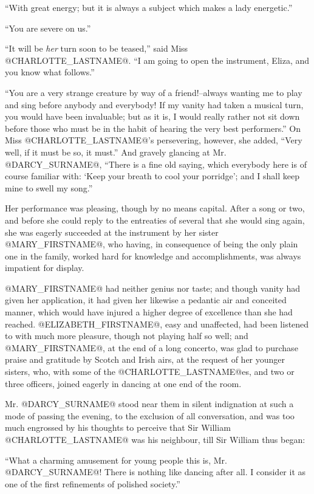 ``With great energy; but it is always a subject which makes a lady
energetic.''

``You are severe on us.''

``It will be \textit{her} turn soon to be teased,'' said Miss @CHARLOTTE_LASTNAME@. ``I am going
to open the instrument, Eliza, and you know what follows.''

``You are a very strange creature by way of a friend!--always wanting me
to play and sing before anybody and everybody! If my vanity had taken
a musical turn, you would have been invaluable; but as it is, I would
really rather not sit down before those who must be in the habit of
hearing the very best performers.'' On Miss @CHARLOTTE_LASTNAME@'s persevering, however,
she added, ``Very well, if it must be so, it must.'' And gravely glancing
at Mr. @DARCY_SURNAME@, ``There is a fine old saying, which everybody here is of
course familiar with: `Keep your breath to cool your porridge'; and I
shall keep mine to swell my song.''

Her performance was pleasing, though by no means capital. After a song
or two, and before she could reply to the entreaties of several that
she would sing again, she was eagerly succeeded at the instrument by her
sister @MARY_FIRSTNAME@, who having, in consequence of being the only plain one in
the family, worked hard for knowledge and accomplishments, was always
impatient for display.

@MARY_FIRSTNAME@ had neither genius nor taste; and though vanity had given her
application, it had given her likewise a pedantic air and conceited
manner, which would have injured a higher degree of excellence than she
had reached. @ELIZABETH_FIRSTNAME@, easy and unaffected, had been listened to with
much more pleasure, though not playing half so well; and @MARY_FIRSTNAME@, at the
end of a long concerto, was glad to purchase praise and gratitude by
Scotch and Irish airs, at the request of her younger sisters, who,
with some of the @CHARLOTTE_LASTNAME@es, and two or three officers, joined eagerly in
dancing at one end of the room.

Mr. @DARCY_SURNAME@ stood near them in silent indignation at such a mode of
passing the evening, to the exclusion of all conversation, and was too
much engrossed by his thoughts to perceive that Sir William @CHARLOTTE_LASTNAME@ was
his neighbour, till Sir William thus began:

``What a charming amusement for young people this is, Mr. @DARCY_SURNAME@! There
is nothing like dancing after all. I consider it as one of the first
refinements of polished society.''

